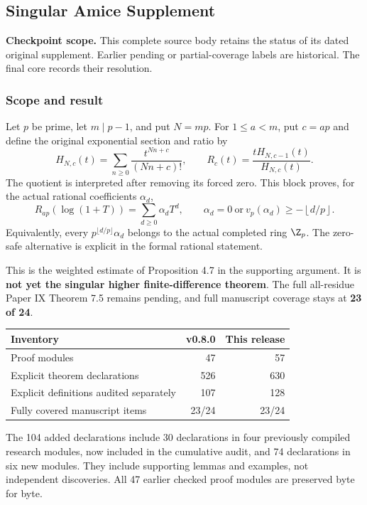 \clearpage\subsection{Singular Amice Supplement}\label{app:sup9}
\noindent\textbf{Checkpoint scope.} This complete source body retains the status of its dated original supplement. Earlier pending or partial-coverage labels are historical. The final core records their resolution.\par\medskip
\subsubsection*{Scope and result}
Let $p$ be prime, let $m\mid p-1$, and put $N=mp$. For $1\le a<m$, put $c=ap$ and define the original exponential section and ratio by
\[
 H_{N,c}(t)=\sum_{n\ge0}\frac{t^{Nn+c}}{(Nn+c)!},\qquad
 R_c(t)=\frac{tH_{N,c-1}(t)}{H_{N,c}(t)}.
\]
The quotient is interpreted after removing its forced zero. This block proves, for the actual rational coefficients $\alpha_d$,
\[
 R_{ap}(\log(1+T))=\sum_{d\ge0}\alpha_dT^d,
 \qquad
 \boxed{\alpha_d=0\ \text{or}\ v_p(\alpha_d)\ge-\left\lfloor d/p\right\rfloor.}
\]
Equivalently, every $p^{\lfloor d/p\rfloor}\alpha_d$ belongs to the actual completed ring $\Z_p$. The zero-safe alternative is explicit in the formal rational statement.

This is the weighted estimate of Proposition 4.7 in the supporting argument. It is \textbf{not yet the singular higher finite-difference theorem}. The full all-residue Paper IX Theorem 7.5 remains pending, and full manuscript coverage stays at \textbf{23 of 24}.

\begin{center}\begin{tabular}{lrr}\toprule
Inventory & v0.8.0 & This release\\\midrule
Proof modules &47&57\\
Explicit theorem declarations &526&630\\
Explicit definitions audited separately &107&128\\
Fully covered manuscript items &23/24&23/24\\\bottomrule
\end{tabular}\end{center}
The 104 added declarations include 30 declarations in four previously compiled research modules, now included in the cumulative audit, and 74 declarations in six new modules. They include supporting lemmas and examples, not independent discoveries. All 47 earlier checked proof modules are preserved byte for byte.

